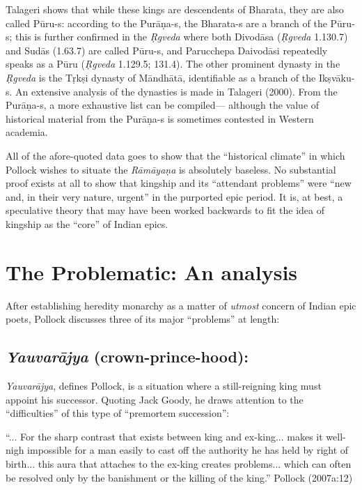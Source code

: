 Talageri shows that while these kings are descendents of Bharata, they are also called Pūru-s: according to the Purāṇa-s, the Bharata-s are a branch of the Pūru-s; this is further confirmed in the {\sl Ṛgveda} where both Divodāsa ({\sl Ṛgveda} 1.130.7) and Sudās (1.63.7) are called Pūru-s, and Parucchepa Daivodāsi repeatedly speaks as a Pūru ({\sl Ṛgveda} 1.129.5; 131.4). The other prominent dynasty in the {\sl Ṛgveda} is the Tṛkṣi dynasty of Māndhātā, identifiable as a branch of the Ikṣvāku-s. An extensive analysis of the dynasties is made in Talageri (2000). From the Purāṇa-s, a more exhaustive list can be compiled--- although the value of historical material from the Purāṇa-s is sometimes contested in Western academia.

All of the afore-quoted data goes to show that the “historical climate” in which Pollock wishes to situate the {\sl Rāmāyaṇa} is absolutely baseless. No substantial proof exists at all to show that kingship and its “attendant problems” were “new and, in their very nature, urgent” in the purported epic period. It is, at best, a speculative theory that may have been worked backwards to fit the idea of kingship as the “core” of Indian epics.  

\section{The Problematic: An analysis}\label{sec1.2}

After establishing heredity monarchy as a matter of {\sl utmost} concern of Indian epic poets, Pollock discusses three of its major “problems” at length: 

\subsection{{\sl\bfseries Yauvarājya} (crown-prince-hood):}\label{sec1.2.1}

{\sl Yauvarājya}, defines Pollock, is a situation where a still-reigning king must appoint his successor. Quoting Jack Goody, he draws attention to the “difficulties” of this type of “premortem succession”:

\begin{myquote}
 “... For the sharp contrast that exists between king and ex-king... makes it well-nigh impossible for a man easily to cast off the authority he has held by right of birth... this aura that attaches to the ex-king creates problems... which can often be resolved only by the banishment or the killing of the king.” 
\hfill Pollock (2007a:12)
\end{myquote}

